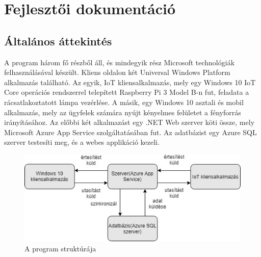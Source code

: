 \documentclass[a4paper,12pt]{report}
\begin{document}
\chapter{Fejlesztői dokumentáció}

\section{Általános áttekintés}
    A program három fő részből áll, és mindegyik rész Microsoft technológiák felhasználásával készült. Kliens oldalon két
    Universal Windows Platform alkalmazás található. Az egyik, IoT kliensalkalmazás, mely egy Windows 10 IoT Core operációs rendszerrel
    telepített Raspberry Pi 3 Model B-n fut, feladata a rácsatlakoztatott lámpa vezérlése. A másik, egy Windows 10 asztali és mobil
    alkalmazás, mely az ügyfelek számára nyújt kényelmes felületet a fényforrás irányításához. Az előbbi két alkalmazást egy .NET Web
    szerver köti össze, mely Microsoft Azure App Service szolgáltatásában fut. Az adatbázist egy Azure SQL szerver testesíti meg, és a webes
    applikáció kezeli.

\begin{figure}[H]
    \centering
    \includegraphics[width=\linewidth]{images/struktura.jpg}
    \caption{A program struktúrája}
    \label{fig: Struktura}
\end{figure}
\end{document}
